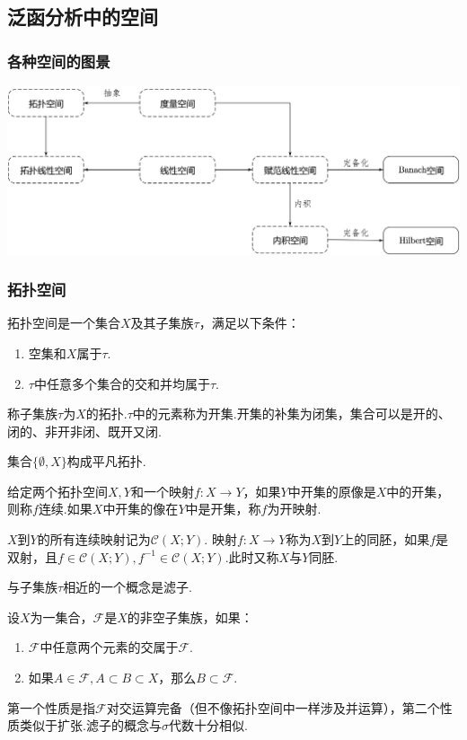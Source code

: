 \subsection{泛函分析中的空间}
\subsubsection{各种空间的图景}
\begin{center}
\includegraphics[width=14cm]{figure/Functional Space - Overview.png}
\end{center}
\subsubsection{拓扑空间}
\begin{definition}[拓扑空间]\label{}
拓扑空间是一个集合$X$及其子集族$\tau$，满足以下条件：

\begin{enumerate}
	\item 空集和$X$属于$\tau$.
	\item $\tau$中任意多个集合的交和并均属于$\tau$.
\end{enumerate}

称子集族$\tau$为$X$的拓扑.$\tau$中的元素称为开集.开集的补集为闭集，集合可以是开的、闭的、非开非闭、既开又闭.

集合$\{\emptyset,X\}$构成平凡拓扑.

给定两个拓扑空间$X,Y$和一个映射$f\colon X\rightarrow Y$，如果$Y$中开集的原像是$X$中的开集，则称$f$连续.如果$X$中开集的像在$Y$中是开集，称$f$为开映射.

$X$到$Y$的所有连续映射记为$\mathcal{C}(X;Y)$.
映射$f\colon X\rightarrow Y$称为$X$到$Y$上的同胚，如果$f$是双射，且$f\in\mathcal{C}(X;Y),f^{-1}\in \mathcal{C}(X;Y)$.此时又称$X$与$Y$同胚.
\end{definition}

与子集族$\tau$相近的一个概念是滤子.

\begin{definition}[滤子]\label{}
设$X$为一集合，$\mathcal{F}$是$X$的非空子集族，如果：
\begin{enumerate}
\item $\mathcal{F}$中任意两个元素的交属于$\mathcal{F}$.
\item 如果$A\in\mathcal{F},A\subset B\subset X$，那么$B\subset \mathcal{F}$.
\end{enumerate}	

\end{definition}
第一个性质是指$\mathcal{F}$对交运算完备（但不像拓扑空间中一样涉及并运算），第二个性质类似于扩张.滤子的概念与$\sigma$代数十分相似.

